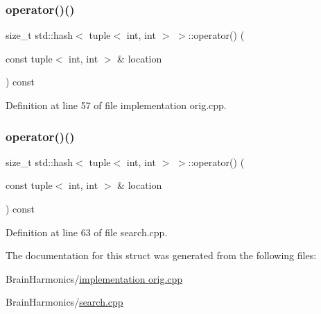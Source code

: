\subsubsection{\texorpdfstring{operator()()}{operator()()}\hspace{0.1cm}{\footnotesize\ttfamily [1/2]}}
{\footnotesize\ttfamily size\+\_\+t std\+::hash$<$ tuple$<$ int, int $>$ $>$\+::operator() (\begin{DoxyParamCaption}\item[{const tuple$<$ int, int $>$ \&}]{location }\end{DoxyParamCaption}) const\hspace{0.3cm}{\ttfamily [inline]}}



Definition at line 57 of file implementation orig.\+cpp.

\mbox{\label{structstd_1_1hash_3_01tuple_3_01int_00_01int_01_4_01_4_af46854ec2c5aa6cd6d1cd164374bd54f}} 
\subsubsection{\texorpdfstring{operator()()}{operator()()}\hspace{0.1cm}{\footnotesize\ttfamily [2/2]}}
{\footnotesize\ttfamily size\+\_\+t std\+::hash$<$ tuple$<$ int, int $>$ $>$\+::operator() (\begin{DoxyParamCaption}\item[{const tuple$<$ int, int $>$ \&}]{location }\end{DoxyParamCaption}) const\hspace{0.3cm}{\ttfamily [inline]}}



Definition at line 63 of file search.\+cpp.



The documentation for this struct was generated from the following files\+:\begin{DoxyCompactItemize}
\item 
Brain\+Harmonics/\hyperlink{implementation_01orig_8cpp}{implementation orig.\+cpp}\item 
Brain\+Harmonics/\hyperlink{search_8cpp}{search.\+cpp}\end{DoxyCompactItemize}
